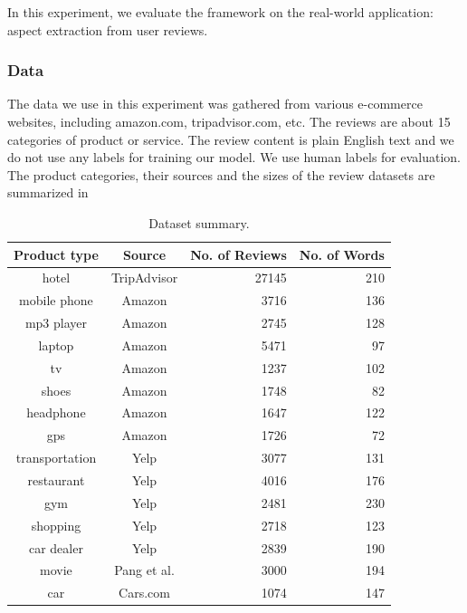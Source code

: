 In this experiment, we evaluate the framework on the real-world application:
aspect extraction from user reviews. 

\subsubsection{Data}

The data we use in this experiment was gathered from various e-commerce 
websites, including amazon.com, tripadvisor.com, etc. 
The reviews are about 15 categories of product or service. 
The review content is plain English text and we do not use any labels 
for training our model. We use human labels for evaluation. 
The product categories, their sources and the sizes of the review datasets
are summarized in 

\begin{table}[th]
\centering
\caption{Dataset summary.} 
\label{table:dataset}
\begin{tabular}{|c|c|r|r|}
\hline
Product type & Source & No. of Reviews & No. of Words \\ \hline \hline
hotel        & TripAdvisor & 27145   & 210 \\\hline
mobile phone & Amazon & 3716    & 136 \\\hline
mp3 player   & Amazon & 2745    & 128 \\\hline
laptop       & Amazon & 5471    & 97  \\\hline
tv           & Amazon & 1237    & 102 \\\hline
shoes        & Amazon &1748    & 82  \\\hline
headphone    & Amazon & 1647    & 122 \\\hline
gps          & Amazon & 1726    & 72  \\\hline
transportation & Yelp & 3077  & 131 \\\hline
restaurant   & Yelp & 4016    & 176 \\\hline
gym          & Yelp & 2481    & 230 \\\hline
shopping     & Yelp & 2718    & 123 \\\hline
car dealer   & Yelp & 2839    & 190 \\\hline 
movie        & Pang et al. \cite{pang2002thumbs} & 3000    & 194 \\\hline
car          & Cars.com & 1074    & 147 \\\hline
\end{tabular}
\end{table}


